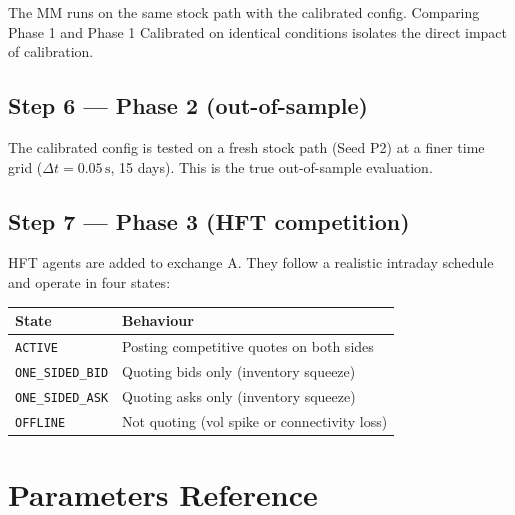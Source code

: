 \documentclass[12pt,a4paper]{article}
\begin{document}
The MM runs on the same stock path with the calibrated config. Comparing Phase 1
and Phase 1 Calibrated on identical conditions isolates the direct impact of
calibration.

\subsection*{Step 6 --- Phase 2 (out-of-sample)}

The calibrated config is tested on a fresh stock path (Seed P2) at a finer time
grid ($\Delta t = 0.05\,\text{s}$, 15 days). This is the true out-of-sample
evaluation.

\subsection*{Step 7 --- Phase 3 (HFT competition)}

HFT agents are added to exchange A. They follow a realistic intraday schedule
and operate in four states:

\begin{center}
\begin{tabular}{ll}
\toprule
\textbf{State} & \textbf{Behaviour} \\
\midrule
\texttt{ACTIVE}        & Posting competitive quotes on both sides \\
\texttt{ONE\_SIDED\_BID} & Quoting bids only (inventory squeeze) \\
\texttt{ONE\_SIDED\_ASK} & Quoting asks only (inventory squeeze) \\
\texttt{OFFLINE}       & Not quoting (vol spike or connectivity loss) \\
\bottomrule
\end{tabular}
\end{center}

\section{Parameters Reference}
\end{document}
